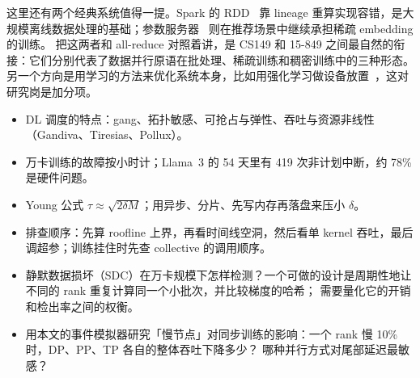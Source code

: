 这里还有两个经典系统值得一提。Spark 的 RDD~\cite{zaharia2012resilient} 靠 lineage 重算实现容错，是大规模离线数据处理的基础；参数服务器~\cite{li2014scaling} 则在推荐场景中继续承担稀疏 embedding 的训练。
把这两者和 all-reduce 对照着讲，是 CS149 和 15-849 之间最自然的衔接：它们分别代表了数据并行原语在批处理、稀疏训练和稠密训练中的三种形态。
另一个方向是用学习的方法来优化系统本身，比如用强化学习做设备放置~\cite{mirhoseini2017device}，这对研究岗是加分项。

\begin{keypts}
\begin{itemize}
\item DL 调度的特点：gang、拓扑敏感、可抢占与弹性、吞吐与资源非线性（Gandiva、Tiresias、Pollux）。
\item 万卡训练的故障按小时计；Llama~3 的 54 天里有 419 次非计划中断，约 78\% 是硬件问题。
\item Young 公式 $\tau\approx\sqrt{2\delta M}$；用异步、分片、先写内存再落盘来压小 $\delta$。
\item 排查顺序：先算 roofline 上界，再看时间线空洞，然后看单 kernel 吞吐，最后调超参；训练挂住时先查 collective 的调用顺序。
\end{itemize}
\end{keypts}

\begin{research}
\begin{itemize}
\item 静默数据损坏（SDC）在万卡规模下怎样检测？一个可做的设计是周期性地让不同的 rank 重复计算同一个小批次，并比较梯度的哈希；
需要量化它的开销和检出率之间的权衡。
\item 用本文的事件模拟器研究「慢节点」对同步训练的影响：一个 rank 慢 10\% 时，DP、PP、TP 各自的整体吞吐下降多少？
哪种并行方式对尾部延迟最敏感？
\end{itemize}
\end{research}
